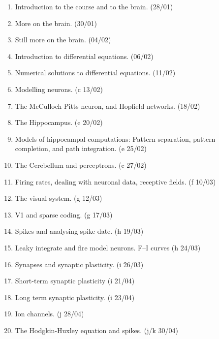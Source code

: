 \documentclass[11pt,a4paper]{scrartcl}
\begin{document}
\begin{enumerate}

\item Introduction to the course and to the brain. (28/01)
\item More on the brain. (30/01)
\item Still more on the brain. (04/02)

\item Introduction to differential equations. (06/02)
\item Numerical solutions to differential equations. (11/02)

\item Modelling neurons. (c 13/02)
\item The McCulloch-Pitts neuron, and Hopfield networks. (18/02)

\item The Hippocampus. (e 20/02)
\item Models of hippocampal computations: Pattern separation, pattern completion, and path integration. (e 25/02)

\item The Cerebellum and perceptrons. (c 27/02) \newline
{}

\item Firing rates, dealing with neuronal data, receptive fields. (f 10/03)

\item The visual system. (g 12/03)

\item V1 and sparse coding. (g 17/03)
\item Spikes and analysing spike date. (h 19/03)

\item Leaky integrate and fire model neurons. F--I curves (h 24/03)
\item Synapses and synaptic plasticity. (i 26/03)
\newline {}
\item Short-term synaptic plasticity (i 21/04)
\item Long term synaptic plasticity. (i 23/04)
  
\item Ion channels. (j 28/04)
\item The Hodgkin-Huxley equation and spikes. (j/k 30/04)

\end{enumerate}
\end{document}
